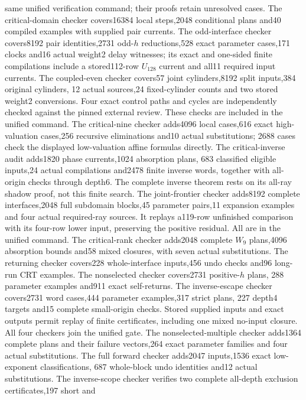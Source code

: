 \documentclass[11pt]{article}
\begin{document}
same unified verification command; their proofs retain unresolved cases.
The critical-domain checker covers16384 local steps,2048 conditional
plans and40 compiled examples with supplied pair currents. The odd-interface
checker covers8192 pair identities,2731 odd-$h$ reductions,528 exact
parameter cases,171 clocks and16 actual weight2 delay witnesses; its
exact and one-sided finite compilations include a stored112-row $U_{128}$
current and all11 required input currents. The coupled-even checker
covers57 joint cylinders,8192 split inputs,384 original cylinders,
12 actual sources,24 fixed-cylinder counts and two stored weight2
conversions. Four exact control paths and cycles are independently checked
against the pinned external review. These checks are included in the
unified command. The critical-nine checker adds4096 local cases,616 exact
high-valuation cases,256 recursive eliminations and10 actual substitutions;
2688 cases check the displayed low-valuation affine formulas directly.
The critical-inverse audit adds1820 phase currents,1024 absorption plans,
683 classified eligible inputs,24 actual compilations and2478 finite inverse
words, together with all-origin checks through depth6. The complete
inverse theorem rests on its all-ray shadow proof, not this finite search.
The joint-frontier checker adds8192 complete interfaces,2048 full subdomain
blocks,45 parameter pairs,11 expansion examples and four actual required-ray
sources. It replays a119-row unfinished comparison with its four-row lower
input, preserving the positive residual. All are in the unified command.
The critical-rank checker adds2048 complete $W_9$ plans,4096 absorption
bounds and58 mixed closures, with seven actual substitutions. The returning
checker covers228 whole-interface inputs,456 undo checks and96 long-run
CRT examples. The nonselected checker covers2731 positive-$h$ plans,
288 parameter examples and911 exact self-returns. The inverse-escape
checker covers2731 word cases,444 parameter examples,317 strict plans,
227 depth4 targets and15 complete small-origin checks. Stored supplied
inputs and exact outputs permit replay of finite certificates, including
one mixed no-input closure. All four checkers join the unified gate.
The nonselected-multiple checker adds1364 complete plans and their failure
vectors,264 exact parameter families and four actual substitutions. The full
forward checker adds2047 inputs,1536 exact low-exponent classifications,
687 whole-block undo identities and12 actual substitutions. The inverse-scope
checker verifies two complete all-depth exclusion certificates,197 short and
\end{document}
